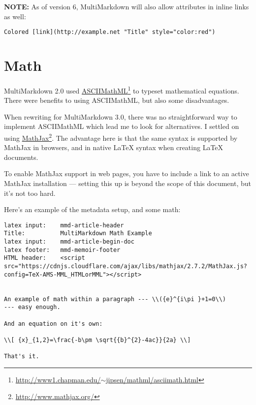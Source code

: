\textbf{NOTE:} As of version 6, MultiMarkdown will also allow attributes in inline links as well:

\begin{verbatim}
Colored [link](http://example.net "Title" style="color:red")
\end{verbatim}

\section{Math}
\label{math}

MultiMarkdown 2.0 used \href{http://www1.chapman.edu/~jipsen/mathml/asciimath.html}{ASCIIMathML}\footnote{\href{http://www1.chapman.edu/~jipsen/mathml/asciimath.html}{http:\slash{}\slash{}www1.chapman.edu\slash{}\ensuremath{\sim}jipsen\slash{}mathml\slash{}asciimath.html}} to typeset mathematical equations. There
were benefits to using ASCIIMathML, but also some disadvantages.

When rewriting for MultiMarkdown 3.0, there was no straightforward way to
implement ASCIIMathML which lead me to look for alternatives. I settled on
using \href{http://www.mathjax.org/}{MathJax}\footnote{\href{http://www.mathjax.org/}{http:\slash{}\slash{}www.mathjax.org\slash{}}}. The advantage here is that the same syntax is supported by
MathJax in browsers, and in native LaTeX syntax when creating LaTeX documents.

To enable MathJax support in web pages, you have to include a link to an
active MathJax installation --- setting this up is beyond the scope of this
document, but it's not too hard.

Here's an example of the metadata setup, and some math:

\begin{verbatim}
latex input:	mmd-article-header  
Title:			MultiMarkdown Math Example  
latex input:	mmd-article-begin-doc  
latex footer:	mmd-memoir-footer  
HTML header:	<script src="https://cdnjs.cloudflare.com/ajax/libs/mathjax/2.7.2/MathJax.js?config=TeX-AMS-MML_HTMLorMML"></script>

		
An example of math within a paragraph --- \\({e}^{i\pi }+1=0\\)
--- easy enough.

And an equation on it's own:

\\[ {x}_{1,2}=\frac{-b\pm \sqrt{{b}^{2}-4ac}}{2a} \\]

That's it.
\end{verbatim}

